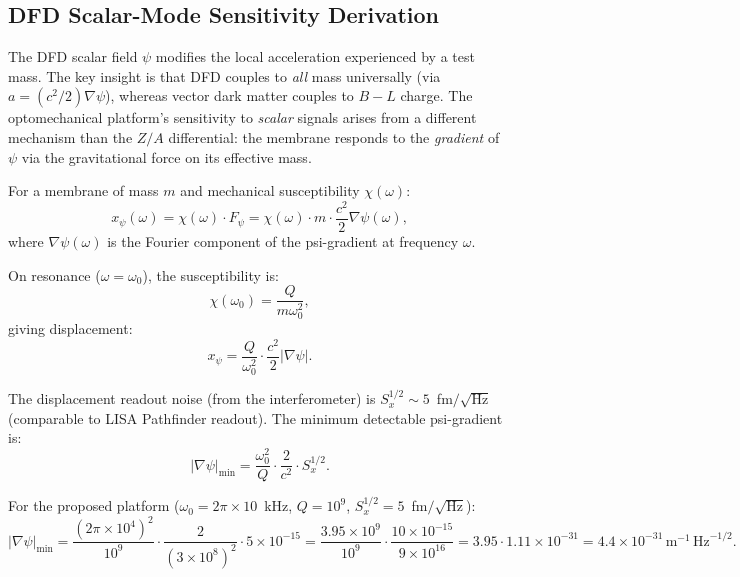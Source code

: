 \documentclass[11pt]{article}
\theoremstyle{definition}
\theoremstyle{remark}
\newcommand{\ee}[1]{\times10^{#1}}
\newcommand{\sqrtHz}{\,\mathrm{Hz}^{-1/2}}
\begin{document}
\subsection{DFD Scalar-Mode Sensitivity Derivation}

The DFD scalar field $\psi$ modifies the local acceleration experienced
by a test mass. The key insight is that DFD couples to \emph{all} mass
universally (via $a = (c^2/2)\nabla\psi$), whereas vector dark matter
couples to $B-L$ charge. The optomechanical platform's sensitivity to
\emph{scalar} signals arises from a different mechanism than the $Z/A$
differential: the membrane responds to the \emph{gradient} of $\psi$
via the gravitational force on its effective mass.

For a membrane of mass $m$ and mechanical susceptibility $\chi(\omega)$:
\begin{equation}
x_\psi(\omega) = \chi(\omega) \cdot F_\psi = \chi(\omega) \cdot m \cdot
\frac{c^2}{2} \nabla\psi(\omega),
\label{eq:membrane-response}
\end{equation}
where $\nabla\psi(\omega)$ is the Fourier component of the psi-gradient
at frequency $\omega$.

On resonance ($\omega = \omega_0$), the susceptibility is:
\begin{equation}
\chi(\omega_0) = \frac{Q}{m\omega_0^2},
\end{equation}
giving displacement:
\begin{equation}
x_\psi = \frac{Q}{\omega_0^2} \cdot \frac{c^2}{2} |\nabla\psi|.
\label{eq:displacement-on-resonance}
\end{equation}

The displacement readout noise (from the interferometer) is
$S_x^{1/2} \sim 5$~fm$/\sqrt{\mathrm{Hz}}$ (comparable to LISA Pathfinder
readout). The minimum detectable psi-gradient is:
\begin{equation}
|\nabla\psi|_{\min} = \frac{\omega_0^2}{Q} \cdot \frac{2}{c^2} \cdot S_x^{1/2}.
\label{eq:psi-gradient-min}
\end{equation}

For the proposed platform ($\omega_0 = 2\pi \times 10$~kHz,
$Q = 10^9$, $S_x^{1/2} = 5$~fm$/\sqrt{\mathrm{Hz}}$):
\begin{equation}
|\nabla\psi|_{\min} = \frac{(2\pi \times 10^4)^2}{10^9}
\cdot \frac{2}{(3\ee{8})^2} \cdot 5\ee{-15}
= \frac{3.95\ee{9}}{10^9} \cdot \frac{10\ee{-15}}{9\ee{16}}
= 3.95 \cdot 1.11\ee{-31}
= 4.4\ee{-31}\,\mathrm{m}^{-1}\sqrtHz.
\label{eq:psi-gradient-numerical}
\end{equation}
\end{document}

